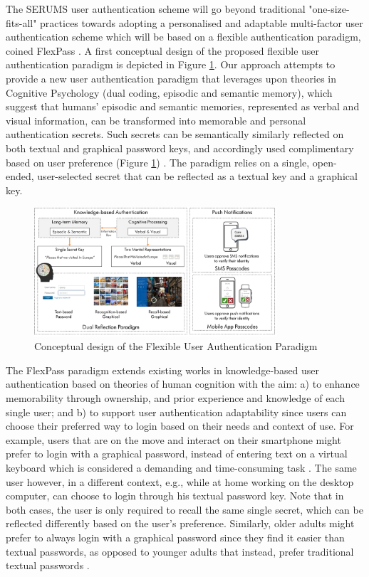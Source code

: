 \label{sec:access}
The SERUMS user authentication scheme will go beyond traditional "one-size-fits-all" practices towards adopting a personalised and adaptable multi-factor user authentication scheme which will be based on a flexible authentication paradigm, coined FlexPass \cite{belk,constantinides,hadjidemetriou}. A first conceptual design of the proposed flexible user authentication paradigm is depicted in Figure \ref{fig:flexpass}. Our approach attempts to provide a new user authentication paradigm that leverages upon theories in Cognitive Psychology (dual coding, episodic and semantic memory), which suggest that humans' episodic and semantic memories, represented as verbal and visual information, can be transformed into memorable and personal authentication secrets. Such secrets can be semantically similarly reflected on both textual and graphical password keys, and accordingly used complimentary based on user preference (Figure \ref{fig:flexpass}) \cite{belk}. The paradigm relies on a single, open-ended, user-selected secret that can be reflected as a textual key and a graphical key. 

\begin{figure}[H]
    \centering
    \includegraphics[width=90mm]{images/flexpass.png}
    \caption{Conceptual design of the Flexible User Authentication Paradigm}
    \label{fig:flexpass}
\end{figure}

The FlexPass paradigm extends existing works in knowledge-based user authentication based on theories of human cognition with the aim: a) to enhance memorability through ownership, and prior experience and knowledge of each single user; and b) to support user authentication adaptability since users can choose their preferred way to login based on their needs and context of use. For example, users that are on the move and interact on their smartphone might prefer to login with a graphical password, instead of entering text on a virtual keyboard which is considered a demanding and time-consuming task \cite{vonzezschwitz}. The same user however, in a different context, e.g., while at home working on the desktop computer, can choose to login through his textual password key. Note that in both cases, the user is only required to recall the same single secret, which can be reflected differently based on the user’s preference. Similarly, older adults might prefer to always login with a graphical password since they find it easier than textual passwords, as opposed to younger adults that instead, prefer traditional textual passwords \cite{nicholson}.

